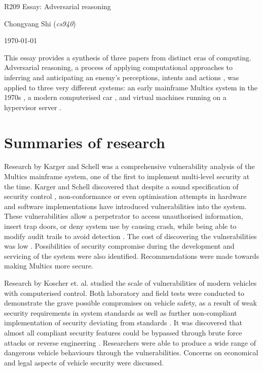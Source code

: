 \documentclass[11pt]{article}
\begin{document}
\centerline{\Large R209 Essay:  Adversarial reasoning}
\vspace{2em}
\centerline{\large Chongyang Shi (\emph{cs940})}
\vspace{1em}
\centerline{\large \today}
\vspace{1em}

This essay provides a synthesis of three papers from distinct eras of computing. Adversarial reasoning, a process of applying computational approaches to inferring and anticipating an enemy's perceptions, intents and actions \cite{kott2015toward}, was applied to three very different systems: an early mainframe Multics system in the 1970s \cite{karger1974multics}, a modern computerised car \cite{koscher2010experimental}, and virtual machines running on a hypervisor server \cite{razavi2016flip}.

\section{Summaries of research}

Research by Karger and Schell \cite{karger1974multics} was a comprehensive vulnerability analysis of the Multics mainframe system, one of the first to implement multi-level security at the time. Karger and Schell discovered that despite a sound specification of security control \cite[3.1]{karger1974multics}, non-conformance \cite[3.2.1]{karger1974multics} or even optimisation attempts \cite[3.3.2]{karger1974multics} in hardware and software implementations have introduced vulnerabilities into the system. These vulnerabilities allow a perpetrator to access unauthorised information, insert trap doors, or deny system use by causing crash, while being able to modify audit trails to avoid detection \cite[3.4.4]{karger1974multics}. The cost of discovering the vulnerabilities was low \cite[Tb. 3]{karger1974multics}. Possibilities of security compromise during the development and servicing of the system were also identified. Recommendations were made towards making Multics more secure.

Research by Koscher et. al. \cite{koscher2010experimental} studied the scale of vulnerabilities of modern vehicles with computerised control. Both laboratory and field tests were conducted to demonstrate the grave possible compromises on vehicle safety, as a result of weak security requirements in system standards \cite[IV. B.]{koscher2010experimental} as well as further non-compliant implementation of security deviating from standards \cite[IV. C.]{koscher2010experimental}. It was discovered that almost all compliant security features could be bypassed through brute force attacks \cite[IV. B.]{koscher2010experimental} or reverse engineering \cite[V. A.]{koscher2010experimental}. Researchers were able to produce a wide range of dangerous vehicle behaviours through the vulnerabilities. Concerns on economical and legal aspects of vehicle security were discussed.
\end{document}
